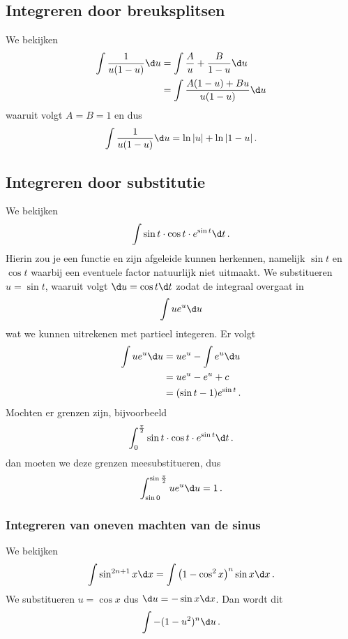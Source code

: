       \subsection{Integreren door breuksplitsen}\label{subsec:integrerenDoorBreuksplitsen}
          We bekijken
          \begin{align*}
              \int \frac{1}{u(1-u)} \d u &= \int \frac{A}{u} + \frac{B}{1-u} \d u \\
              &= \int \frac{A(1-u)+Bu}{u(1-u)} \d u
          \end{align*}
          waaruit volgt $A=B=1$ en dus
          \[ \int \frac{1}{u(1-u)} \d u = \ln |u| + \ln |1-u|\,. \]
      \subsection{Integreren door substitutie}\label{subsec:integrerenDoorSubstitutie}
          We bekijken
          \[ \int \sin t \cdot \cos t \cdot e^{\sin t} \d t\,. \]
          Hierin zou je een functie en zijn afgeleide kunnen herkennen, namelijk
          $\sin t$ en $\cos t$ waarbij een eventuele factor natuurlijk niet uitmaakt.
          We substitueren $u = \sin t$, waaruit volgt $\d u = \cos t \d t$
          zodat de integraal overgaat in
          \[ \int u e^u \d u \]
          wat we kunnen uitrekenen met partieel integeren.
          Er volgt
          \begin{align*}
              \int u e^u \d u &= u e^u - \int e^u \d u \\
              &=  u e^u -  e^u + c \\
              &= (\sin t -1) e^{\sin t} \,.
          \end{align*}
          Mochten er grenzen zijn, bijvoorbeeld
          \[ \int_0^{\frac{\pi}{2}} \sin t \cdot \cos t \cdot e^{\sin t} \d t\,. \]
          dan moeten we deze grenzen meesubstitueren, dus
          \[ \int_{\sin 0}^{\sin \frac{\pi}{2}} u e^u \d u = 1\,. \]
	\subsubsection{Integreren van oneven machten van de sinus}
		We bekijken
		\begin{align*}
			\int \sin^{2n+1} x \d x = \int \left( 1-\cos^2 x \right)^n \sin x \d x \,.
		\end{align*}
		We substitueren $u=\cos x$ dus $\d u = - \sin x \d x$.
		Dan wordt dit
		\begin{align*}
			\int -(1-u^2)^n \d u\,.
		\end{align*}